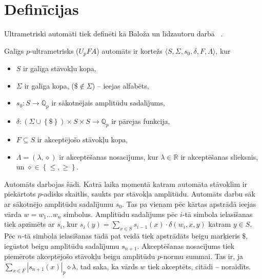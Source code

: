 \documentclass{ludis}
\begin{document}
\section{Definīcijas}
Ultrametriski automāti tiek definēti kā Baloža un līdzautoru darbā ~\citep{KasparsBalodis2013}.
\begin{definicija}
Galīgs $p$-ultrametrisks ($U_pFA$) automāts ir kortežs $\langle S, \Sigma, s_0, \delta, F, \Lambda \rangle$, kur
\begin{itemize}
  \item $S$ ir galīga stāvokļu kopa,
  \item $\Sigma$ ir galīga kopa, ($\$ \notin \Sigma$) -- ieejas alfabēts,
  \item $s_0:S \rightarrow \mathbb{Q}_p$ ir sākotnējais amplitūdu sadalījums, %
  \item $\delta: \left( \Sigma \cup \left\{ \$ \right\} \right) \times S \times S \rightarrow \mathbb{Q}_p$ ir pārejas funkcija,
  \item $F \subseteq S$ ir akceptējošo stāvokļu kopa,
  \item $\Lambda = \left( \lambda, \diamond \right)$ ir akceptēšanas nosacījums, kur $\lambda \in \mathbb{R}$ ir akceptēšanas slieksnis, un $\diamond \in \left\{ \leq, \geq \right\}$.
\end{itemize}
Automāts darbojas šādi.
Katrā laika momentā katram automāta stāvoklim ir piekārtots $p$-adisks skaitlis, saukts par stāvokļa amplitūdu.
Automāts darbu sāk ar sākotnējo amplitūdu sadalījumu $s_0$.
Tas pa vienam pēc kārtas apstrādā ieejas vārda $w = w_1 \ldots w_n$ simbolus.
Amplitūdu sadalījums pēc $i$-tā simbola ielasīšanas tiek apzīmēts ar $s_i$, kur
$s_i(y) = \sum_{x \in S}{s_{i-1}(x) \cdot \delta \left( w_i, x, y \right) }$ katram $y \in S$.
Pēc $n$-tā simbola ielasīšanas tādā pat veidā tiek apstrādāts beigu marķieris $\$$, iegūstot beigu amplitūdu sadalījumu $s_{n+1}$.
Akceptēšanas nosacījums tiek piemērots akceptējošo stāvokļu beigu amplitūdu $p$-normu summai. Tas ir, ja $\sum_{x \in F}{\left| s_{n+1}(x) \right|_p} \diamond \lambda$, tad saka, ka vārds $w$ tiek akceptēts, citādi -- noraidīts.
\end{definicija}
\end{document}
